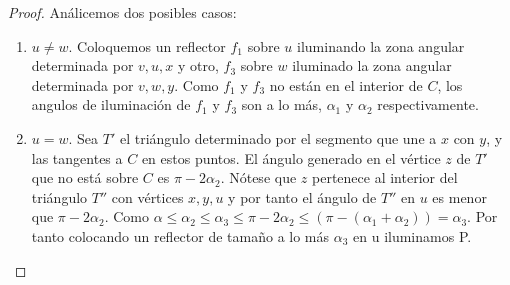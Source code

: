 \begin{enumerate}
\begin{proof}
    Análicemos dos posibles casos:
    \begin{enumerate}
    \item $u \not= w$. Coloquemos un reflector $f_1$ sobre $u$ iluminando la zona angular
      determinada por $v, u, x$ y otro, $f_3$ sobre $w$ iluminado la zona angular
      determinada por $v, w, y$. Como $f_1$ y $f_3$ no están en el interior de $C$, los
      angulos de iluminación de $f_1$ y $f_3$ son a lo más, $\alpha_1$ y $\alpha_2$ respectivamente.
    \item $u = w$. Sea $T'$ el triángulo determinado por el segmento que une a $x$ con
      $y$, y las tangentes a $C$ en estos puntos. El ángulo generado en el vértice
      $z$ de $T'$  que no está sobre $C$ es $\pi - 2\alpha_2$. Nótese que $z$ pertenece al interior
      del triángulo $T''$ con vértices $x, y, u$ y por tanto el ángulo de $T''$ en $u$ es
      menor que $\pi - 2\alpha_2$. Como $\alpha \leq \alpha_2 \leq \alpha_3 \leq \pi - 2\alpha_2 \leq (\pi - (\alpha_1 + \alpha_2)) = \alpha_3$.
      Por tanto colocando un reflector de tamaño a lo más $\alpha_3$ en u iluminamos P.
    \end{enumerate}
  \end{proof}
\end{enumerate}
